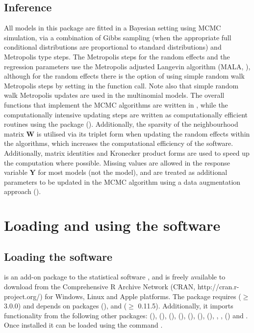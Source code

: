 \documentclass[article,shortnames,nojss]{jss}
\begin{document}
\subsection{Inference}
All models in this package are fitted in a Bayesian setting using MCMC simulation, via a combination of Gibbs sampling (when the appropriate full conditional distributions are proportional to standard distributions) and Metropolis type steps. The Metropolis steps for the random effects and the regression parameters  use the Metropolis adjusted Langevin algorithm (MALA, \citealp{roberts1998}), although for the random effects there is the option of using simple random walk Metropolis steps by setting  in the function call. Note also that simple random walk Metropolis updates are used in the multinomial models. The overall functions that implement the MCMC algorithms are written in , while the computationally intensive updating steps are written as computationally efficient   routines using the  package  (\citealp{eddelbuettel2011}). Additionally, the sparsity of the neighbourhood matrix $\mathbf{W}$ is utilised via its triplet form when updating the random effects  within the algorithms, which increases the computational efficiency of the software. Additionally, matrix identities and Kronecker product forms are used to speed up the computation where possible. Missing values are allowed in the response variable $\mathbf{Y}$ for most models (not the  model), and are treated as additional parameters to be updated in the MCMC algorithm using a data augmentation approach (\citealp{tanner1987}).



\section{Loading and using the software}

\subsection{Loading the software}
 is an add-on package to the statistical software , and is freely available to download from the Comprehensive R Archive Network (CRAN, http://cran.r-project.org/) for Windows, Linux and Apple platforms. The package requires  ($\geq$ 3.0.0) and depends on packages  (\citealp{mass2002}), and  ($\geq$ 0.11.5). Additionally, it imports functionality from the following other packages:  (\citealp{carbayesdata}),  (\citealp{coda2006}),  (\citealp{leaflet}),  (\citealp{matrixcalc}),  (\citealp{mcmcpack}),  (\citealp{spam2010}),  (\citealp{bivand2013b}), , ,  (\citealp{truncnorm2014}) and . Once installed it can be loaded using the command .
\end{document}
